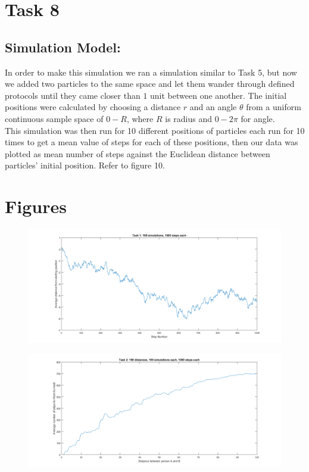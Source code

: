 \documentclass[10pt, a4paper]{article}
\begin{document}
\section*{Task 8}
\subsection*{Simulation Model:}
In order to make this simulation we ran a simulation similar to Task 5, but now we added two particles to the same space and let them wander through defined protocols until they came closer than $1$ unit between one another. The initial positions were calculated by choosing a distance $r$ and an angle $\theta$ from a uniform continuous sample space of $0-R$, where $R$ is radius and $0-2\pi$ for angle.\\
This simulation was then run for 10 different positions of particles each run for 10 times to get a mean value of steps for each of these positions, then our data was plotted as mean number of steps against the Euclidean distance between particles' initial position.
Refer to figure 10.

\newpage

\section*{Figures}

\begin{figure}[H]
    \includegraphics[width=\textwidth]{Diagrams/Task 1 Testing/100 simulations, 1000 steps/graph.png}
    \caption{}
    \label{fig:1}    
  \end{figure}

\begin{figure}[H]
    \includegraphics[width=\textwidth]{Diagrams/Task 2 Testing/ureka.png}
    \caption{}
    \label{fig:2}
\end{figure}
\end{document}
